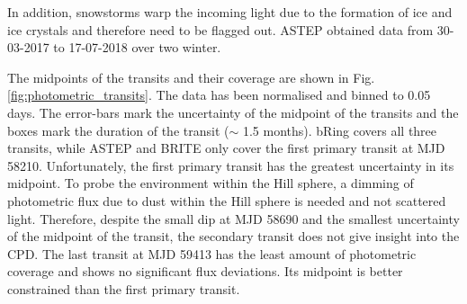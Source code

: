 %
In addition, snowstorms warp the incoming light due to the formation of ice and ice crystals and therefore need to be flagged out.
%
ASTEP obtained data from 30-03-2017 to 17-07-2018 over two winter.
%






The midpoints of the transits and their coverage are shown in Fig. \ref{fig:photometric_transits}. 
%
The data has been normalised and binned to 0.05 days.
%
The error-bars mark the uncertainty of the midpoint of the transits and the boxes mark the duration of the transit ($\sim$ 1.5 months). 
%
bRing covers all three transits, while ASTEP and BRITE only cover the first primary transit at MJD 58210.
%
Unfortunately, the first primary transit has the greatest uncertainty in its midpoint.
%
To probe the environment within the Hill sphere, a dimming of photometric flux due to dust within the Hill sphere is needed and not scattered light. 
%
Therefore, despite the small dip at MJD 58690 and the smallest uncertainty of the midpoint of the transit, the secondary transit does not give insight into the CPD.
%
The last transit at MJD 59413 has the least amount of photometric coverage and shows no significant flux deviations. 
%
Its midpoint is better constrained than the first primary transit.







